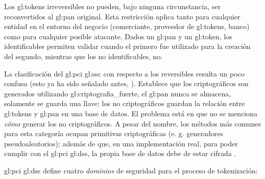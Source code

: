 Los \glspl{gl:token} irreversibles no pueden, bajo ninguna circunstancia, ser
reconvertidos al \gls{gl:pan} original. Esta restricción aplica tanto para
cualquier entidad en el entorno del negocio (comerciante, proveedor de
\glspl{gl:token}, banco) como para cualquier posible atacante. Dados un
\gls{gl:pan} y un \gls{gl:token}, los identificables permiten validar cuando el
primero fue utilizado para la creación del segundo, mientras que los no
identificables, no.



La clasificación del \gls{gl:pci} \gls{gl:ssc} con respecto a los reversibles
resulta un poco confusa (esto ya ha sido señalado antes, \cite{doc_sandra}).
Establece que los criptográficos son generados utilizando
\gls{gl:criptografia_fuerte}, el \gls{gl:pan} nunca se almacena, solamente se
guarda una llave; los no criptográficos guardan la relación entre
\glspl{gl:token} y \gls{gl:pan} en una base de datos. El problema está en que
no se menciona \textit{cómo} generar los no criptográficos. A pesar del nombre,
los métodos más comunes para esta categoría ocupan primitivas criptográficas
(e. g. generadores pseudoaleatorios); además de que, en una implementación
real, para poder cumplir con el \gls{gl:pci} \gls{gl:dss}, la propia base de
datos debe de estar cifrada \cite{pci_dss}.

\gls{gl:pci} \gls{gl:dss} define cuatro \textit{dominios} de seguridad para el
proceso de tokenización:

